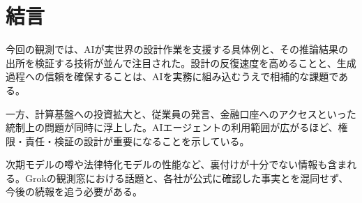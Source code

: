\section*{結言}
今回の観測では、AIが実世界の設計作業を支援する具体例と、その推論結果の出所を検証する技術が並んで注目された。設計の反復速度を高めることと、生成過程への信頼を確保することは、AIを実務に組み込むうえで相補的な課題である。

一方、計算基盤への投資拡大と、従業員の発言、金融口座へのアクセスといった統制上の問題が同時に浮上した。AIエージェントの利用範囲が広がるほど、権限・責任・検証の設計が重要になることを示している。

次期モデルの噂や法律特化モデルの性能など、裏付けが十分でない情報も含まれる。Grokの観測窓における話題と、各社が公式に確認した事実とを混同せず、今後の続報を追う必要がある。

